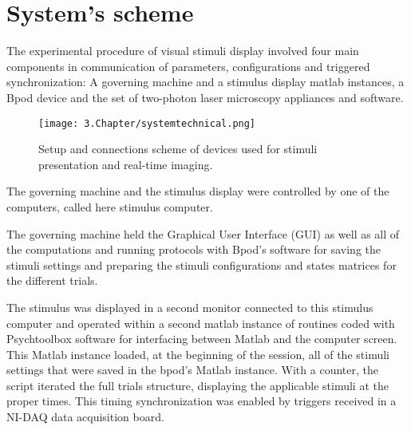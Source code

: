 \section{System's scheme}
\label{sec:sectiona}

The experimental procedure of visual stimuli display involved four main components in communication of parameters, configurations and triggered synchronization: A governing machine and a stimulus display matlab instances, a Bpod device and the set of two-photon laser microscopy appliances and software. 

\begin{figure}[H]
	\centering
		\texttt{[image: 3.Chapter/systemtechnical.png]}
	\caption[c1]{Setup and connections scheme of devices used for stimuli presentation and real-time imaging.}
	\label{fig:systemtechnical}
\end{figure}

The governing machine and the stimulus display were controlled by one of the computers, called here stimulus computer.

The governing machine held the Graphical User Interface (GUI) as well as all of the computations and running protocols with Bpod's software for saving the stimuli settings and preparing the stimuli configurations and states matrices for the different trials. 

The stimulus was displayed in a second monitor connected to this stimulus computer and operated within a second matlab instance of routines coded with Psychtoolbox software for interfacing between Matlab and the computer screen. This Matlab instance loaded, at the beginning of the session, all of the stimuli settings that were saved in the bpod's Matlab instance. With a counter, the script iterated the full trials structure, displaying the applicable stimuli at the proper times. This timing synchronization was enabled by triggers received in a NI-DAQ data acquisition board. 

